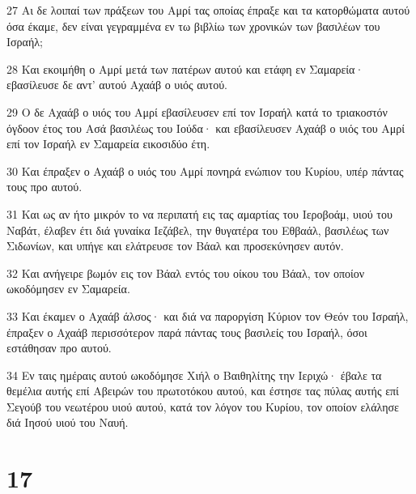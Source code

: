 \par 27 Αι δε λοιπαί των πράξεων του Αμρί τας οποίας έπραξε και τα κατορθώματα αυτού όσα έκαμε, δεν είναι γεγραμμένα εν τω βιβλίω των χρονικών των βασιλέων του Ισραήλ;
\par 28 Και εκοιμήθη ο Αμρί μετά των πατέρων αυτού και ετάφη εν Σαμαρεία· εβασίλευσε δε αντ' αυτού Αχαάβ ο υιός αυτού.
\par 29 Ο δε Αχαάβ ο υιός του Αμρί εβασίλευσεν επί τον Ισραήλ κατά το τριακοστόν όγδοον έτος του Ασά βασιλέως του Ιούδα· και εβασίλευσεν Αχαάβ ο υιός του Αμρί επί τον Ισραήλ εν Σαμαρεία εικοσιδύο έτη.
\par 30 Και έπραξεν ο Αχαάβ ο υιός του Αμρί πονηρά ενώπιον του Κυρίου, υπέρ πάντας τους προ αυτού.
\par 31 Και ως αν ήτο μικρόν το να περιπατή εις τας αμαρτίας του Ιεροβοάμ, υιού του Ναβάτ, έλαβεν έτι διά γυναίκα Ιεζάβελ, την θυγατέρα του Εθβαάλ, βασιλέως των Σιδωνίων, και υπήγε και ελάτρευσε τον Βάαλ και προσεκύνησεν αυτόν.
\par 32 Και ανήγειρε βωμόν εις τον Βάαλ εντός του οίκου του Βάαλ, τον οποίον ωκοδόμησεν εν Σαμαρεία.
\par 33 Και έκαμεν ο Αχαάβ άλσος· και διά να παροργίση Κύριον τον Θεόν του Ισραήλ, έπραξεν ο Αχαάβ περισσότερον παρά πάντας τους βασιλείς του Ισραήλ, όσοι εστάθησαν προ αυτού.
\par 34 Εν ταις ημέραις αυτού ωκοδόμησε Χιήλ ο Βαιθηλίτης την Ιεριχώ· έβαλε τα θεμέλια αυτής επί Αβειρών του πρωτοτόκου αυτού, και έστησε τας πύλας αυτής επί Σεγούβ του νεωτέρου υιού αυτού, κατά τον λόγον του Κυρίου, τον οποίον ελάλησε διά Ιησού υιού του Ναυή.

\chapter{17}


